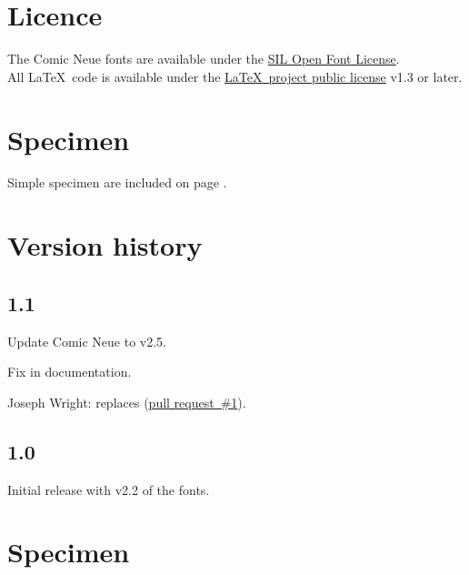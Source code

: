 \documentclass[10pt,a4paper,english,twocolumn]{article}
\begin{document}
\section{Licence}
The Comic Neue fonts are available under the \href{http://scripts.sil.org/OFL}{SIL Open Font License}.\\
All \LaTeX\ code is available under the \href{http://www.latex-project.org/lppl/}{\LaTeX\ project public license} v1.3 or later.

\section{Specimen}
Simple specimen are included on page \pageref{sec:specimen}.

\clearpage

\section{Version history}

\subsection*{1.1}
\begin{itemize*}
    \item Update Comic Neue to v2.5.
    \item Fix  in documentation.
\end{itemize*}

\begin{itemize*}
	\item Joseph Wright:  replaces  (\href{https://github.com/silkeh/latex-raleway/pull/1}{pull request~\#1}).
\end{itemize*}

\subsection*{1.0}
\begin{itemize*}
	\item Initial release with v2.2 of the fonts.
\end{itemize*}

\onecolumn
\clearpage

\section{Specimen}
\label{sec:specimen}
\end{document}
